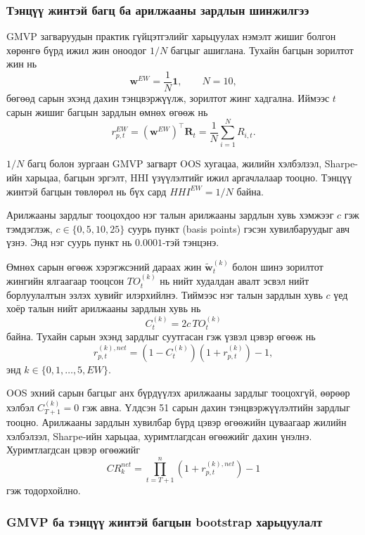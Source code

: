 \subsubsection{Тэнцүү жинтэй багц ба арилжааны зардлын шинжилгээ}
\label{subsubsec:equal_weight_costs}

GMVP загваруудын практик гүйцэтгэлийг
харьцуулах нэмэлт жишиг болгон хөрөнгө бүрд
ижил жин оноодог $1/N$ багцыг ашиглана.
Тухайн багцын зорилтот жин нь
\[
\boldsymbol{w}^{EW}=\frac{1}{N}\boldsymbol{1},
\qquad N=10,
\]
бөгөөд сарын эхэнд дахин тэнцвэржүүлж,
зорилтот жинг хадгална. Иймээс $t$ сарын
жишиг багцын зардлын өмнөх өгөөж нь
\[
r_{p,t}^{EW}
=\left(\boldsymbol{w}^{EW}\right)^\top
\boldsymbol{R}_t
=\frac{1}{N}\sum_{i=1}^{N}R_{i,t}.
\]

$1/N$ багц болон зургаан GMVP загварт
OOS хугацаа, жилийн хэлбэлзэл, Sharpe-ийн
харьцаа, багцын эргэлт, HHI үзүүлэлтийг
ижил аргачлалаар тооцно. Тэнцүү жинтэй
багцын төвлөрөл нь бүх сард
$HHI^{EW}=1/N$ байна.

Арилжааны зардлыг тооцохдоо нэг талын
арилжааны зардлын хувь хэмжээг $c$ гэж
тэмдэглэж, $c\in\{0,5,10,25\}$ суурь
пункт (basis points) гэсэн хувилбаруудыг
авч үзнэ. Энд нэг суурь пункт нь
$0.0001$-тэй тэнцэнэ.

Өмнөх сарын өгөөж хэрэгжсэний дараах
жин $\widetilde{\boldsymbol{w}}_t^{(k)}$
болон шинэ зорилтот жингийн ялгаагаар
тооцсон $TO_t^{(k)}$ нь нийт худалдан
авалт эсвэл нийт борлуулалтын эзлэх хувийг
илэрхийлнэ. Тиймээс нэг талын зардлын
хувь $c$ үед хоёр талын нийт арилжааны
зардлын хувь нь
\[
C_t^{(k)}=2c\,TO_t^{(k)}
\]
байна. Тухайн сарын эхэнд зардлыг
суутгасан гэж үзвэл цэвэр өгөөж нь
\[
r_{p,t}^{(k),net}
=\left(1-C_t^{(k)}\right)
\left(1+r_{p,t}^{(k)}\right)-1,
\]
энд $k\in\{0,1,\ldots,5,EW\}$.

OOS эхний сарын багцыг анх бүрдүүлэх
арилжааны зардлыг тооцохгүй, өөрөөр
хэлбэл $C_{T+1}^{(k)}=0$ гэж авна.
Үлдсэн 51 сарын дахин тэнцвэржүүлэлтийн
зардлыг тооцно. Арилжааны зардлын
хувилбар бүрд цэвэр өгөөжийн цуваагаар
жилийн хэлбэлзэл, Sharpe-ийн харьцаа,
хуримтлагдсан өгөөжийг дахин үнэлнэ.
Хуримтлагдсан цэвэр өгөөжийг
\[
CR_k^{net}
=\prod_{t=T+1}^{n}
\left(1+r_{p,t}^{(k),net}\right)-1
\]
гэж тодорхойлно.


\subsubsection{GMVP ба тэнцүү жинтэй багцын
	bootstrap харьцуулалт}
\label{subsubsec:bootstrap_equal_weight}

